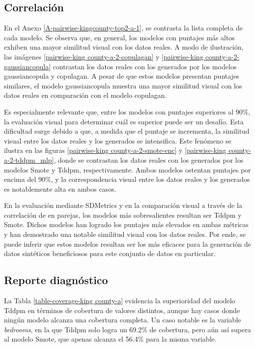 \newpage

\subsection{Correlación}
\label{correlacion-kingcounty}
En el Anexo \ref{A-pairwise-kingcounty-top2-a-1}, se contrasta la lista completa de cada modelo. Se observa que, en general, los modelos con puntajes más altos exhiben una mayor similitud visual con los datos reales. A modo de ilustración, las imágenes \ref{pairwise-king county-a-2-copulagan} y \ref{pairwise-king county-a-2-gaussiancopula} contrastan los datos reales con los generados por los modelos gaussiancopula y copulagan. A pesar de que estos modelos presentan puntajes similares, el modelo gaussiancopula muestra una mayor similitud visual con los datos reales en comparación con el modelo copulagan.



\newpage
Es especialmente relevante que, entre los modelos con puntajes superiores al 90\%, la evaluación visual para determinar cuál es superior puede ser un desafío. Esta dificultad surge debido a que, a medida que el puntaje se incrementa, la similitud visual entre los datos reales y los generados se intensifica. Este fenómeno se ilustra en las figuras \ref{pairwise-king county-a-2-smote-enc} y \ref{pairwise-king county-a-2-tddpm_mlp}, donde se contrastan los datos reales con los generados por los modelos Smote y Tddpm, respectivamente. Ambos modelos ostentan puntajes por encima del 90\%, y la correspondencia visual entre los datos reales y los generados es notablemente alta en ambos casos.




\newpage
En la evaluación mediante SDMetrics y en la comparación visual a través de la correlación de en parejas, los modelos más sobresalientes resultan ser Tddpm y Smote. Dichos modelos han logrado los puntajes más elevados en ambas métricas y han demostrado una notable similitud visual con los datos reales. Por ende, se puede inferir que estos modelos resultan ser los más eficaces para la generación de datos sintéticos beneficiosos para este conjunto de datos en particular.

\subsection{Reporte diagnóstico}
\label{diagnostico-kingcounty}
La Tabla \ref{table-coverage-king county-a} evidencia la superioridad del modelo Tddpm en términos de cobertura de valores distintos, aunque hay casos donde ningún modelo alcanza una cobertura completa. Un caso notable es la variable \emph{bedrooms}, en la que Tddpm solo logra un 69.2\% de cobertura, pero aún así supera al modelo Smote, que apenas alcanza el 56.4\% para la misma variable.

